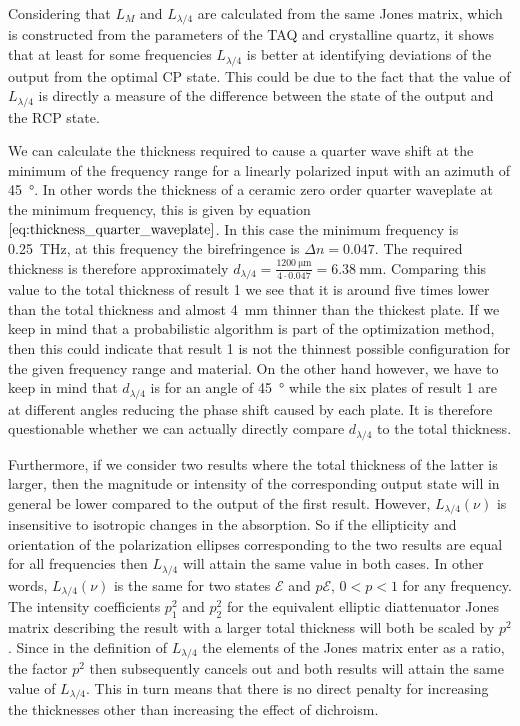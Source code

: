 Considering that $L_M$ and $L_{\lambda/4}$ are calculated from the same Jones matrix, which is constructed from the parameters of the TAQ and crystalline quartz, it shows that at least for some frequencies $L_{\lambda/4}$ is better at identifying deviations of the output from the optimal CP state. This could be due to the fact that the value of $L_{\lambda/4}$ is directly a measure of the difference between the state of the output and the RCP state.

We can calculate the thickness required to cause a quarter wave shift at the minimum of the frequency range for a linearly polarized input with an azimuth of \SI{45}{\degree}. In other words the thickness of a ceramic zero order quarter waveplate at the minimum frequency, this is given by equation $\ref{eq:thickness_quarter_waveplate}$. In this case the minimum frequency is \SI{0.25}{\tera \hertz}, at this frequency the birefringence is $\Delta n = 0.047$. The required thickness is therefore approximately $d_{\lambda/4}=\frac{\SI{1200}{\micro \meter}}{4\cdot0.047}=\SI{6.38}{\milli \meter}$. Comparing this value to the total thickness of result 1 we see that it is around five times lower than the total thickness and almost \SI{4}{\milli \meter} thinner than the thickest plate. If we keep in mind that a probabilistic algorithm is part of the optimization method, then this could indicate that result 1 is not the thinnest possible configuration for the given frequency range and material. On the other hand however, we have to keep in mind that $d_{\lambda/4}$ is for an angle of \SI{45}{\degree} while the six plates of result 1 are at different angles reducing the phase shift caused by each plate. It is therefore questionable whether we can actually directly compare $d_{\lambda/4}$ to the total thickness. 

Furthermore, if we consider two results where the total thickness of the latter is larger, then the magnitude or intensity of the corresponding output state will in general be lower compared to the output of the first result. However, $L_{\lambda/4}(\nu)$ is insensitive to isotropic changes in the absorption. So if the ellipticity and orientation of the polarization ellipses corresponding to the two results are equal for all frequencies then $L_{\lambda/4}$ will attain the same value in both cases. In other words, $L_{\lambda/4}(\nu)$ is the same for two states $\bm{\mathcal{E}}$ and $p\bm{\mathcal{E}}$, $0<p<1$ for any frequency. The intensity coefficients $p_1^2$ and $p_2^2$ for the equivalent elliptic diattenuator Jones matrix describing the result with a larger total thickness will both be scaled by $p^2$. Since in the definition of $L_{\lambda/4}$ the elements of the Jones matrix enter as a ratio, the factor $p^2$ then subsequently cancels out and both results will attain the same value of $L_{\lambda/4}$. This in turn means that there is no direct penalty for increasing the thicknesses other than increasing the effect of dichroism. 

